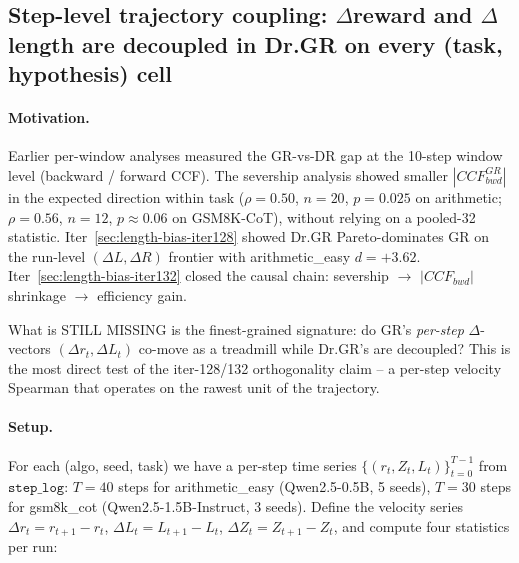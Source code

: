 %

\subsection{Step-level trajectory coupling: $\Delta$reward and $\Delta$length
are decoupled in Dr.GR on every (task, hypothesis) cell}
\label{sec:length-bias-iter136}

\paragraph{Motivation.}
Earlier per-window analyses measured the GR-vs-DR gap at the
10-step window level (backward / forward CCF).
The severship analysis showed smaller $|CCF^{GR}_{bwd}|$ in the expected
direction within task ($\rho=0.50$, $n=20$, $p=0.025$ on arithmetic;
$\rho=0.56$, $n=12$, $p\approx0.06$ on GSM8K-CoT), without relying on a
pooled-32 statistic.
Iter~\ref{sec:length-bias-iter128} showed Dr.GR Pareto-dominates GR on
the run-level $(\Delta L, \Delta R)$ frontier with arithmetic\_easy
$d=+3.62$.
Iter~\ref{sec:length-bias-iter132} closed the causal chain:
severship $\rightarrow$ $|CCF_{bwd}|$ shrinkage $\rightarrow$
efficiency gain.

What is STILL MISSING is the finest-grained signature:
do GR's \emph{per-step} $\Delta$-vectors $({\Delta r_t, \Delta L_t})$
co-move as a treadmill while Dr.GR's are decoupled?
This is the most direct test of the iter-128/132 orthogonality claim
-- a per-step velocity Spearman that operates on the rawest unit of
the trajectory.

\paragraph{Setup.}
For each (algo, seed, task) we have a per-step time series
$\{(r_t, Z_t, L_t)\}_{t=0}^{T-1}$ from $\texttt{step\_log}$:
$T=40$ steps for arithmetic\_easy (Qwen2.5-0.5B, 5 seeds),
$T=30$ steps for gsm8k\_cot (Qwen2.5-1.5B-Instruct, 3 seeds).
Define the velocity series
$\Delta r_t = r_{t+1} - r_t$, $\Delta L_t = L_{t+1} - L_t$,
$\Delta Z_t = Z_{t+1} - Z_t$, and compute four statistics per run:

